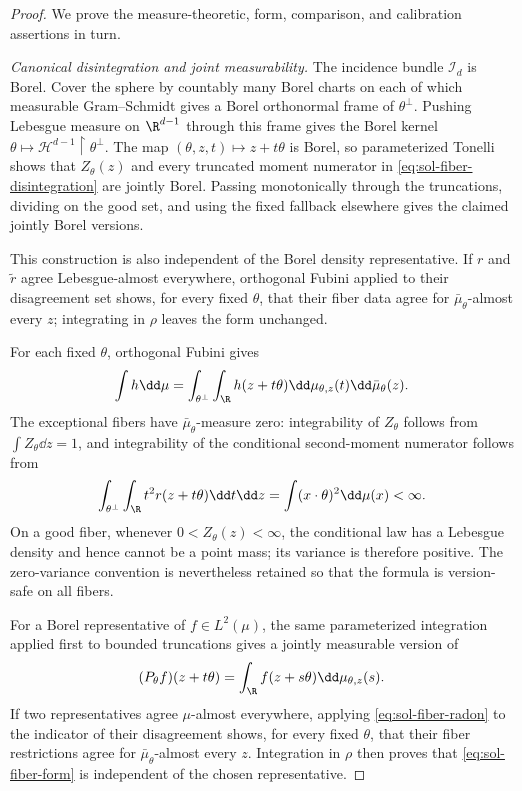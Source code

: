 \documentclass[../main.tex]{subfiles}
\begin{document}
\begin{proof}
We prove the measure-theoretic, form, comparison, and calibration assertions in turn.

\emph{Canonical disintegration and joint measurability.}
The incidence bundle $\mathcal I_d$ is Borel.  Cover the sphere by countably many Borel charts
on each of which measurable Gram--Schmidt gives a Borel orthonormal frame of $\theta^\perp$.
Pushing Lebesgue measure on $\R^{d-1}$ through this frame gives the Borel kernel
$\theta\mapsto\mathcal H^{d-1}\!\restriction\theta^\perp$.  The map
$(\theta,z,t)\mapsto z+t\theta$ is Borel, so parameterized Tonelli shows that
$Z_\theta(z)$ and every truncated moment numerator in
\eqref{eq:sol-fiber-disintegration} are jointly Borel.  Passing monotonically through the
truncations, dividing on the good set, and using the fixed fallback elsewhere gives the claimed
jointly Borel versions.

This construction is also independent of the Borel density representative.  If $r$ and
$\widetilde r$ agree Lebesgue-almost everywhere, orthogonal Fubini applied to their disagreement
set shows, for every fixed $\theta$, that their fiber data agree for
$\bar\mu_\theta$-almost every $z$; integrating in $\rho$ leaves the form unchanged.

For each fixed $\theta$, orthogonal Fubini gives
\begin{equation}
  \int h\dd\mu
  =\int_{\theta^\perp}\int_\R h(z+t\theta)
    \dd\mu_{\theta,z}(t)\dd\bar\mu_\theta(z).
  \label{eq:sol-fiber-radon}
\end{equation}
The exceptional fibers have $\bar\mu_\theta$-measure zero: integrability of $Z_\theta$ follows
from $\int Z_\theta\dd z=1$, and integrability of the conditional second-moment numerator follows
from
\begin{equation}
  \int_{\theta^\perp}\int_\R t^2r(z+t\theta)\dd t\dd z
  =\int (x\cdot\theta)^2\dd\mu(x)<\infty.
\end{equation}
On a good fiber, whenever $0<Z_\theta(z)<\infty$, the conditional law has a Lebesgue density and
hence cannot be a point mass; its variance is therefore positive.  The zero-variance convention
is nevertheless retained so that the formula is version-safe on all fibers.

For a Borel representative of $f\in L^2(\mu)$, the same parameterized integration applied first
to bounded truncations gives a jointly measurable version of
\begin{equation}
  (P_\theta f)(z+t\theta)
  =\int_\R f(z+s\theta)\dd\mu_{\theta,z}(s).
  \label{eq:sol-fiber-P}
\end{equation}
If two representatives agree $\mu$-almost everywhere, applying
\eqref{eq:sol-fiber-radon} to the indicator of their disagreement shows, for every fixed
$\theta$, that their fiber restrictions agree for $\bar\mu_\theta$-almost every $z$.
Integration in $\rho$ then proves that \eqref{eq:sol-fiber-form} is independent of the chosen
representative.


\end{proof}
\end{document}
